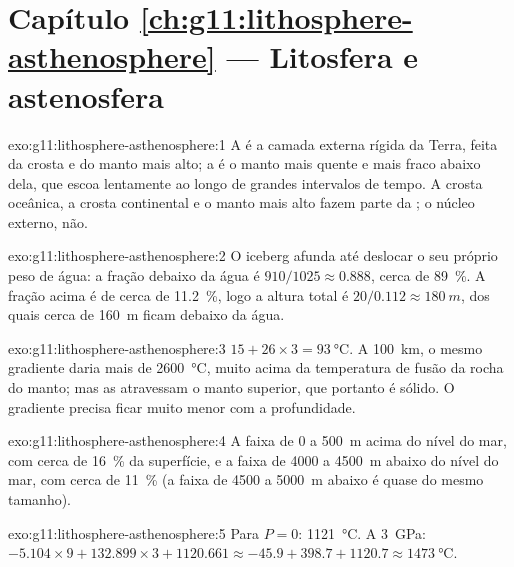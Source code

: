 \section*{Capítulo \ref{ch:g11:lithosphere-asthenosphere} --- Litosfera e astenosfera}

\begin{solution}{exo:g11:lithosphere-asthenosphere:1}
A  é a camada externa rígida da Terra, feita da crosta e do manto
mais alto; a  é o manto mais quente e mais fraco abaixo dela, que
escoa lentamente ao longo de grandes intervalos de tempo. A crosta oceânica,
a crosta continental e o manto mais alto fazem parte da ; o núcleo
externo, não.
\end{solution}

\begin{solution}{exo:g11:lithosphere-asthenosphere:2}
O iceberg afunda até deslocar o seu próprio peso de água: a fração debaixo
da água é $910/1025 \approx 0.888$, cerca de \qty{89}{\percent}. A fração
acima é de cerca de \qty{11.2}{\percent}, logo a altura total é
$20/0.112 \approx \qty{180}{m}$, dos quais cerca de \qty{160}{m} ficam
debaixo da água.
\end{solution}

\begin{solution}{exo:g11:lithosphere-asthenosphere:3}
$15 + 26 \times 3 = \qty{93}{\celsius}$. A \qty{100}{km}, o mesmo gradiente
daria mais de \qty{2600}{\celsius}, muito acima da temperatura de fusão da
rocha do manto; mas as  atravessam o manto superior, que portanto é
sólido. O gradiente precisa ficar muito menor com a profundidade.
\end{solution}

\begin{solution}{exo:g11:lithosphere-asthenosphere:4}
A faixa de 0 a \qty{500}{m} acima do nível do mar, com cerca de
\qty{16}{\percent} da superfície, e a faixa de 4000 a \qty{4500}{m} abaixo
do nível do mar, com cerca de \qty{11}{\percent} (a faixa de 4500 a
\qty{5000}{m} abaixo é quase do mesmo tamanho).
\end{solution}

\begin{solution}{exo:g11:lithosphere-asthenosphere:5}
Para $P = 0$: \qty{1121}{\celsius}. A \qty{3}{GPa}: $-5.104 \times 9 +
132.899 \times 3 + 1120.661 \approx -45.9 + 398.7 + 1120.7 \approx
\qty{1473}{\celsius}$.
\end{solution}

